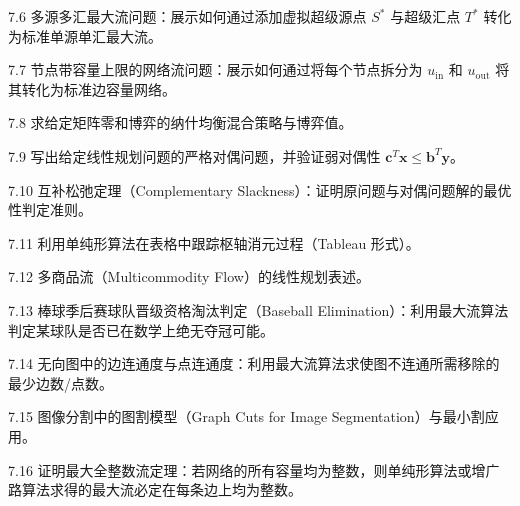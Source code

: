 \begin{exercise}{7.6}
多源多汇最大流问题：展示如何通过添加虚拟超级源点 $S^*$ 与超级汇点 $T^*$ 转化为标准单源单汇最大流。
\end{exercise}

\begin{exercise}{7.7}
节点带容量上限的网络流问题：展示如何通过将每个节点拆分为 $u_{\text{in}}$ 和 $u_{\text{out}}$ 将其转化为标准边容量网络。
\end{exercise}

\begin{exercise}{7.8}
求给定矩阵零和博弈的纳什均衡混合策略与博弈值。
\end{exercise}

\begin{exercise}{7.9}
写出给定线性规划问题的严格对偶问题，并验证弱对偶性 $\bm{c}^T \bm{x} \le \bm{b}^T \bm{y}$。
\end{exercise}

\begin{exercise}{7.10}
互补松弛定理（Complementary Slackness）：证明原问题与对偶问题解的最优性判定准则。
\end{exercise}

\begin{exercise}{7.11}
利用单纯形算法在表格中跟踪枢轴消元过程（Tableau 形式）。
\end{exercise}

\begin{exercise}{7.12}
多商品流（Multicommodity Flow）的线性规划表述。
\end{exercise}

\begin{exercise}{7.13}
棒球季后赛球队晋级资格淘汰判定（Baseball Elimination）：利用最大流算法判定某球队是否已在数学上绝无夺冠可能。
\end{exercise}

\begin{exercise}{7.14}
无向图中的边连通度与点连通度：利用最大流算法求使图不连通所需移除的最少边数/点数。
\end{exercise}

\begin{exercise}{7.15}
图像分割中的图割模型（Graph Cuts for Image Segmentation）与最小割应用。
\end{exercise}

\begin{exercise}{7.16}
证明最大全整数流定理：若网络的所有容量均为整数，则单纯形算法或增广路算法求得的最大流必定在每条边上均为整数。
\end{exercise}

